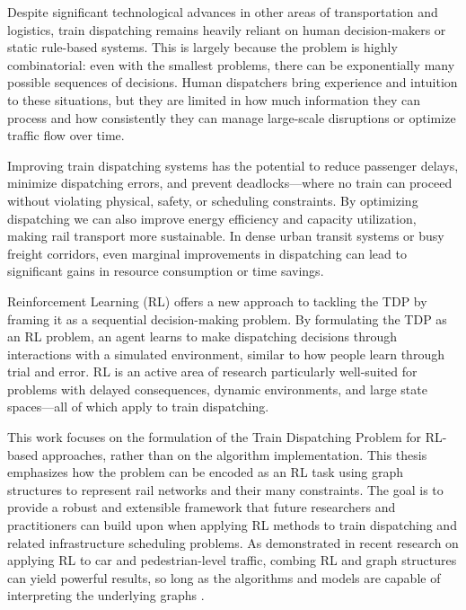 \documentclass[runningheads]{llncs}
\begin{document}
Despite significant technological advances in other areas of transportation and logistics, train dispatching remains heavily reliant on human decision-makers or static rule-based systems. 
This is largely because the problem is highly combinatorial: even with the smallest problems, there can be exponentially many possible sequences of decisions. 
Human dispatchers bring experience and intuition to these situations, but they are limited in how much information they can process and how consistently they can manage large-scale disruptions or optimize traffic flow over time.

Improving train dispatching systems has the potential to reduce passenger delays, minimize dispatching errors, and prevent deadlocks—where no train can proceed without violating physical, safety, or scheduling constraints. 
By optimizing dispatching we can also improve energy efficiency and capacity utilization, making rail transport more sustainable. 
In dense urban transit systems or busy freight corridors, even marginal improvements in dispatching can lead to significant gains in resource consumption or time savings.

Reinforcement Learning (RL) offers a new approach to tackling the TDP by framing it as a sequential decision-making problem.
By formulating the TDP as an RL problem, an agent learns to make dispatching decisions through interactions with a simulated environment, similar to how people learn through trial and error. 
RL is an active area of research particularly well-suited for problems with delayed consequences, dynamic environments, and large state spaces—all of which apply to train dispatching. 

This work focuses on the formulation of the Train Dispatching Problem for RL-based approaches, rather than on the algorithm implementation. 
This thesis emphasizes how the problem can be encoded as an RL task using graph structures to represent rail networks and their many constraints. 
The goal is to provide a robust and extensible framework that future researchers and practitioners can build upon when applying RL methods to train dispatching and related infrastructure scheduling problems.
As demonstrated in recent research on applying RL to car and pedestrian-level traffic, combing RL and graph structures can yield powerful results, so long as the algorithms and models are capable of interpreting the underlying graphs \cite{gnndrl:Devailly_2022}.
\end{document}
